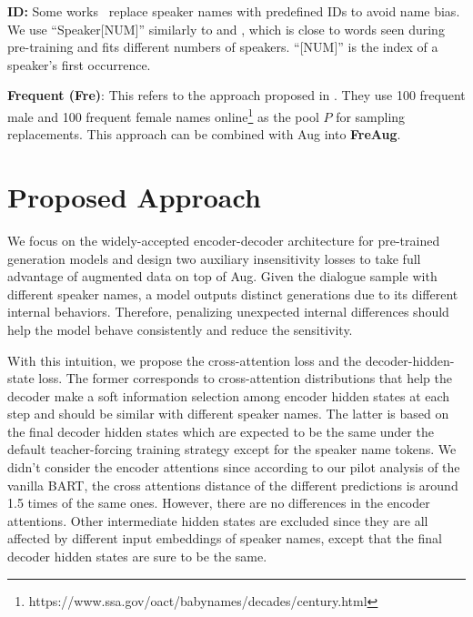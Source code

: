 \textbf{ID:} Some works~\cite{cui2020mutual,li2017dailydialog} replace speaker names with predefined IDs to avoid name bias.
We use ``Speaker[NUM]'' similarly to \citet{kim2019eighth} and \citet{chen2021dialogsum}, 
which is close to words seen during pre-training and fits different numbers of speakers.
``[NUM]'' is the index of a speaker's first occurrence. 

\textbf{Frequent (Fre)}: This refers to the approach proposed in \citet{khalifa2021bag}. They use 100 frequent male and 100 frequent female names online\footnote{https://www.ssa.gov/oact/babynames/decades/century.html} as the pool $P$ for sampling replacements. This approach can be combined with Aug into \textbf{FreAug}.




\section{Proposed Approach}
\label{sec:approach}




We focus on the widely-accepted encoder-decoder architecture for pre-trained generation models and design two auxiliary insensitivity losses to take full advantage of augmented data on top of Aug. 
Given the dialogue sample with different speaker names, a model outputs distinct generations due to its different internal behaviors. Therefore, penalizing unexpected internal differences should help the model behave consistently and reduce the sensitivity.
 
With this intuition, we propose the cross-attention loss and the decoder-hidden-state loss. 
The former corresponds to cross-attention distributions that help the decoder make a soft information selection among encoder hidden states at each step and should be similar with different speaker names. 
The latter is based on the final decoder hidden states which are expected to be the same under the default teacher-forcing training strategy except for the speaker name tokens.
We didn't consider the encoder attentions since according to our pilot analysis of the vanilla BART, %
the cross attentions distance of the different predictions is around 1.5 times of the same ones. However, there are no differences in the encoder attentions. 
Other intermediate hidden states are excluded since they are all affected by different input embeddings of speaker names, except that the final decoder hidden states are sure to be the same.%

